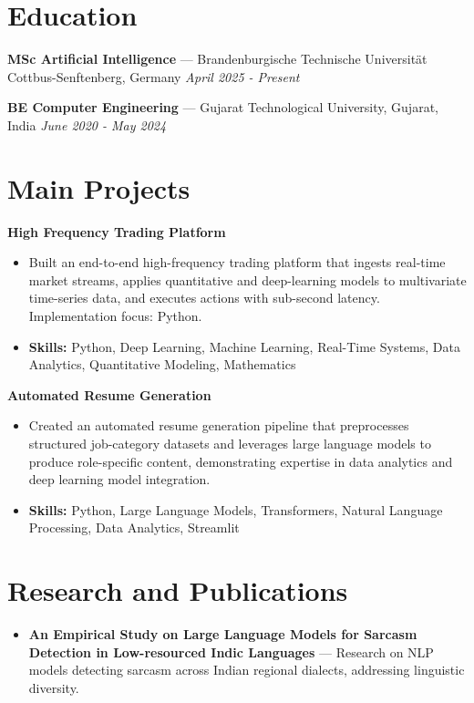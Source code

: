 \documentclass[a4paper,10pt]{article}
\begin{document}
\section*{Education}
\textbf{MSc Artificial Intelligence} — Brandenburgische Technische Universität Cottbus-Senftenberg, Germany \hfill \textit{April 2025 - Present}\par
\vspace{1.5pt}
\textbf{BE Computer Engineering} — Gujarat Technological University, Gujarat, India \hfill \textit{June 2020 - May 2024}\par

\section*{Main Projects}
\textbf{High Frequency Trading Platform}\par
\vspace{1pt}
\begin{itemize}
  \item Built an end-to-end high-frequency trading platform that ingests real-time market streams, applies quantitative and deep-learning models to multivariate time-series data, and executes actions with sub-second latency. Implementation focus: Python.
  \item \textbf{Skills:} Python, Deep Learning, Machine Learning, Real-Time Systems, Data Analytics, Quantitative Modeling, Mathematics
\end{itemize}
\vspace{3pt}
\textbf{Automated Resume Generation}\par
\vspace{1pt}
\begin{itemize}
  \item Created an automated resume generation pipeline that preprocesses structured job-category datasets and leverages large language models to produce role-specific content, demonstrating expertise in data analytics and deep learning model integration.
  \item \textbf{Skills:} Python, Large Language Models, Transformers, Natural Language Processing, Data Analytics, Streamlit
\end{itemize}

\section*{Research and Publications}
\begin{itemize}
\item \textbf{An Empirical Study on Large Language Models for Sarcasm Detection in Low-resourced Indic Languages} — Research on NLP models detecting sarcasm across Indian regional dialects, addressing linguistic diversity.
\end{itemize}
\end{document}
